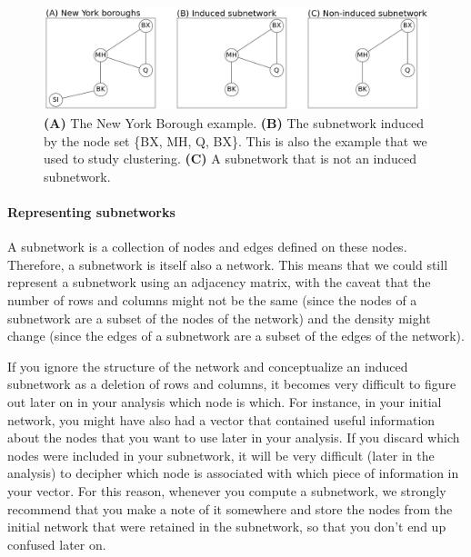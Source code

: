 \begin{figure}[h]
    \centering
    \includegraphics[width=\linewidth]{representations/ch4/Images/subnet.png}
    \caption[New York boroughs example]{\textbf{(A)} The New York Borough example. \textbf{(B)} The subnetwork induced by the node set \{BX, MH, Q, BX\}. This is also the example that we used to study clustering. \textbf{(C)} A subnetwork that is not an induced subnetwork.}
    \label{fig:ch4:subnet}
\end{figure}

\paragraph*{Representing subnetworks}
A subnetwork is a collection of nodes and edges defined on these nodes. Therefore, a subnetwork is itself also a network. This means that we could still represent a subnetwork using an adjacency matrix, with the caveat that the number of rows and columns might not be the same (since the nodes of a subnetwork are a subset of the nodes of the network) and the density might change (since the edges of a subnetwork are a subset of the edges of the network).

\begin{floatingbox}\caption{A caveat with the adjacency matrix of subnetworks}
If you ignore the structure of the network and conceptualize an induced subnetwork as a {deletion} of rows and columns, it becomes very difficult to figure out later on in your analysis which node is which. For instance, in your initial network, you might have also had a vector that contained useful information about the nodes that you want to use later in your analysis. If you discard which nodes were included in your subnetwork, it will be very difficult (later in the analysis) to decipher which node is associated with which piece of information in your vector. For this reason, whenever you compute a subnetwork, we {strongly} recommend that you make a note of it somewhere and store the nodes from the initial network that were retained in the subnetwork, so that you don't end up confused later on.
\end{floatingbox}

